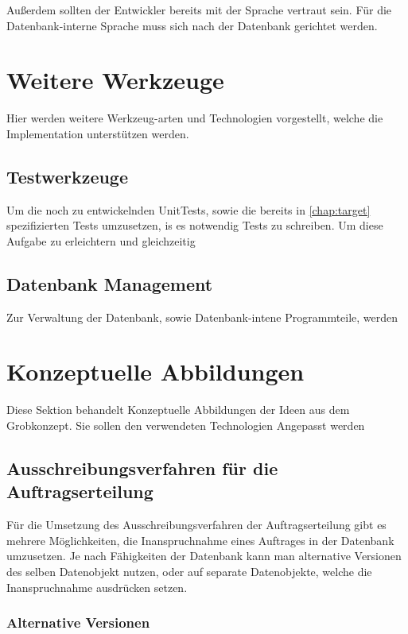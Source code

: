 Außerdem sollten der Entwickler bereits mit der Sprache vertraut sein.
Für die Datenbank-interne Sprache muss sich nach der Datenbank gerichtet werden.


\section{Weitere Werkzeuge}

Hier werden weitere Werkzeug-arten und Technologien vorgestellt,
welche die Implementation unterstützen werden.

\subsection{Testwerkzeuge}

Um die noch zu entwickelnden UnitTests,
sowie die bereits in \cref{chap:target} spezifizierten Tests umzusetzen,
is es notwendig Tests zu schreiben. Um diese Aufgabe zu erleichtern
und gleichzeitig 

\subsection{Datenbank Management}

Zur Verwaltung der Datenbank, sowie Datenbank-intene Programmteile,
werden 


\section{Konzeptuelle Abbildungen}

Diese Sektion behandelt Konzeptuelle Abbildungen der Ideen aus dem Grobkonzept.
Sie sollen den verwendeten Technologien Angepasst werden

\subsection{Ausschreibungsverfahren für die Auftragserteilung}

Für die Umsetzung des Ausschreibungsverfahren der Auftragserteilung gibt es
mehrere Möglichkeiten, die Inanspruchnahme eines Auftrages in
der Datenbank umzusetzen. Je nach Fähigkeiten der Datenbank kann man 
alternative Versionen des selben Datenobjekt nutzen,
oder auf separate Datenobjekte, welche die Inanspruchnahme ausdrücken setzen.

\subsubsection{Alternative Versionen}

